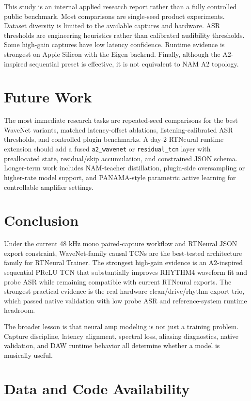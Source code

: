 \documentclass[11pt]{article}
\begin{document}
This study is an internal applied research report rather than a fully
controlled public benchmark. Most comparisons are single-seed product
experiments. Dataset diversity is limited to the available captures and
hardware. ASR thresholds are engineering heuristics rather than calibrated
audibility thresholds. Some high-gain captures have low latency confidence.
Runtime evidence is strongest on Apple Silicon with the Eigen backend. Finally,
although the A2-inspired sequential preset is effective, it is not equivalent
to NAM A2 topology.

\section{Future Work}

The most immediate research tasks are repeated-seed comparisons for the best
WaveNet variants, matched latency-offset ablations, listening-calibrated ASR
thresholds, and controlled plugin benchmarks. A day-2 RTNeural runtime
extension should add a fused \texttt{a2\_wavenet} or \texttt{residual\_tcn}
layer with preallocated state, residual/skip accumulation, and constrained JSON
schema. Longer-term work includes NAM-teacher distillation, plugin-side
oversampling or higher-rate model support, and PANAMA-style parametric active
learning for controllable amplifier settings.

\section{Conclusion}

Under the current 48 kHz mono paired-capture workflow and RTNeural JSON export
constraint, WaveNet-family causal TCNs are the best-tested architecture family
for RTNeural Trainer. The strongest high-gain evidence is an A2-inspired
sequential PReLU TCN that substantially improves RHYTHM4 waveform fit and
probe ASR while remaining compatible with current RTNeural exports. The
strongest practical evidence is the real hardware clean/drive/rhythm export
trio, which passed native validation with low probe ASR and reference-system
runtime headroom.

The broader lesson is that neural amp modeling is not just a training problem.
Capture discipline, latency alignment, spectral loss, aliasing diagnostics,
native validation, and DAW runtime behavior all determine whether a model is
musically useful.

\section*{Data and Code Availability}
\end{document}
